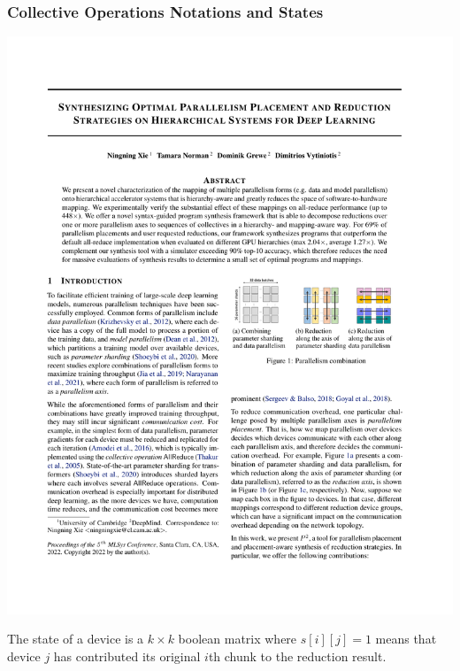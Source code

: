 \documentclass[12pt,aspectratio=169]{beamer}
\begin{document}
    \begin{frame}
        \frametitle{Collective Operations Notations and States}

        \begin{center}
            \vspace{-1em}
            \includegraphics[page=5,trim=1.9cm 4.9cm 11cm 20cm,clip,scale=0.95]{p2.pdf}
        \end{center}

        The state of a device is a $k \times k$ boolean matrix where $s[i][j] = 1$ means that device $j$ has contributed
        its original $i$th chunk to the reduction result.


\end{frame}
\end{document}
